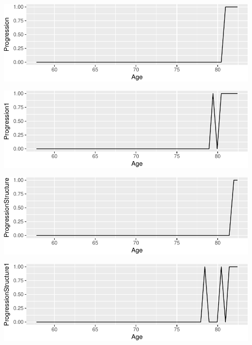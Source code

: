 \documentclass[ignorenonframetext,]{beamer}
\begin{document}
\begin{frame}{}

\includegraphics{analisi_exp_markdown_files/figure-beamer/unnamed-chunk-11-1.pdf}

\includegraphics{analisi_exp_markdown_files/figure-beamer/unnamed-chunk-12-1.pdf}

\includegraphics{analisi_exp_markdown_files/figure-beamer/unnamed-chunk-13-1.pdf}

\includegraphics{analisi_exp_markdown_files/figure-beamer/unnamed-chunk-14-1.pdf}

\end{frame}
\end{document}
